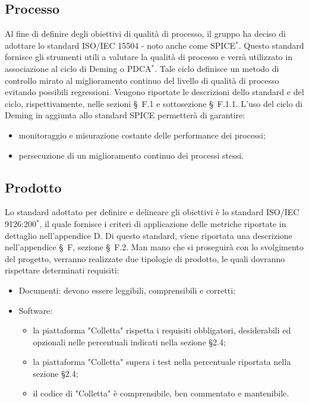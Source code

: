 \subsection{Processo}
Al fine di definire degli obiettivi di qualità di processo, il gruppo ha deciso di adottare lo standard ISO/IEC 15504 - noto anche come SPICE$^*$. Questo standard fornisce gli strumenti utili a valutare la qualità di processo e verrà utilizzato in associazione al ciclo di Deming o PDCA$^*$. Tale ciclo definisce un metodo di controllo mirato al miglioramento continuo del livello di qualità di processo evitando possibili regressioni. 
Vengono riportate le descrizioni dello standard e del ciclo, rispettivamente, nelle sezioni \S\ F.1 e sottosezione \S\ F.1.1. 
L'uso del ciclo di Deming in aggiunta allo standard SPICE permetterà di garantire:
\begin{itemize}
	\item monitoraggio e misurazione costante delle performance dei processi;
	\item persecuzione di un miglioramento continuo dei processi stessi.
\end{itemize}

\subsection{Prodotto}
Lo standard adottato per definire e delineare gli obiettivi è lo standard ISO/IEC 9126:200$^*$, il quale fornisce i criteri di applicazione delle metriche riportate in dettaglio nell'appendice D. 
Di questo standard, viene riportata una descrizione nell'appendice \S\ F, sezione \S\ F.2.
Man mano che si proseguirà con lo svolgimento del progetto, verranno realizzate due tipologie di prodotto, le quali dovranno rispettare determinati requisiti:
\begin{itemize}
	\item Documenti: devono essere leggibili, comprensibili e corretti;
	\item Software: 
	\begin{itemize}
		\item la piattaforma "Colletta" rispetta i requisiti obbligatori, desiderabili ed opzionali nelle percentuali indicati nella sezione \S2.4;
		\item la piattaforma "Colletta" supera i test nella percentuale riportata nella sezione \S2.4;
		\item il codice di "Colletta" è comprensibile, ben commentato e mantenibile.
	\end{itemize}
\end{itemize}


